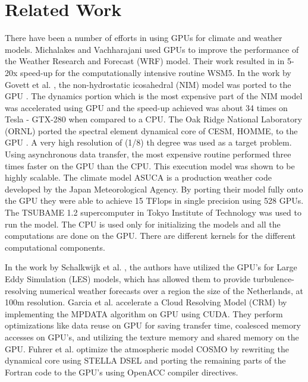 \section{Related Work}
\label{related}

There have been a number of efforts in using GPUs for climate and weather models.  Michalakes and Vachharajani \cite{michalakes-gpuweather-ipdps2008} used GPUs to improve the performance of the Weather Research and Forecast (WRF) model.  Their work resulted in  in 5-20x speed-up for the computationally intensive routine WSM5. 
In the work by Govett et al. \cite{govett-nim-ccgrid2010}, the non-hydrostatic icosahedral (NIM) model was ported to the GPU \cite{govett-nim-ccgrid2010}.  The dynamics portion which is the most expensive part of the NIM model was accelerated using GPU and the speed-up achieved was about 34 times on Tesla - GTX-280 when compared to a CPU.
The Oak Ridge National Laboratory (ORNL) ported the spectral element dynamical core of CESM, HOMME, to the GPU \cite{carpenter-homme-ijhpca2013}.
A very high resolution of (1/8) th degree was used as a target problem.
Using asynchronous data transfer, the most expensive routine performed three times faster on the GPU than the CPU. This execution model was shown to be highly scalable.  The climate model ASUCA \cite{shimokawabe-asuca-sc2010} is a production weather code developed by the Japan Meteorological Agency. By porting their model fully onto the GPU they were able to achieve 15 TFlops in single precision using 528 GPUs. The TSUBAME 1.2 supercomputer in Tokyo Institute of Technology was used to run the model. The CPU is used only for initializing the models and all the computations are done on the GPU. There are different kernels for the different computational components.

In the work by Schalkwijk et al. \cite{schalkwijk-eddygpu-ams2015}, the authors have utilized the GPU's for Large Eddy Simulation (LES) models, which has allowed them to provide turbulence-resolving numerical weather forecasts over a region the size of the Netherlands, at 100m resolution. Garcia et al. \cite{garcia-cloud-iccs2012} accelerate a Cloud Resolving Model (CRM) by implementing the MPDATA algorithm on GPU using CUDA.  They  perform optimizations like data reuse on GPU for saving transfer time, coalesced memory accesses on GPU's, and utilizing the texture memory and shared memory on the GPU. Fuhrer et al. \cite{fuhrer-portableweatherclimate-sci2014} optimize the atmospheric model COSMO by rewriting the dynamical core using STELLA DSEL and porting the remaining parts of the Fortran code to the GPU's using OpenACC compiler directives.

